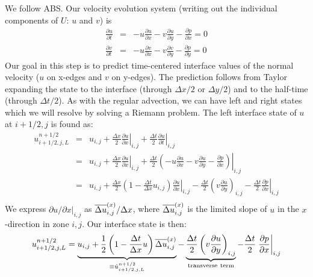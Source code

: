 We follow ABS.  Our velocity evolution system (writing out the
individual components of $U$: $u$ and $v$) is
\begin{eqnarray}
\frac{\partial u}{\partial t} &=& -u \frac{\partial u}{\partial x} 
                                  -v \frac{\partial u}{\partial y} 
                                  -\frac{\partial p}{\partial x} = 0 \\
\frac{\partial v}{\partial t} &=& -u \frac{\partial v}{\partial x} 
                                  -v \frac{\partial v}{\partial y} 
                                  -\frac{\partial p}{\partial y} = 0 
\end{eqnarray}
Our goal in this step is to predict time-centered interface values of
the normal velocity ($u$ on x-edges and $v$ on y-edges).  The
prediction follows from Taylor expanding the state to the interface
(through $\Delta x/2$ or $\Delta y/2$) and to the half-time (through
$\Delta t/2$).  As with the regular advection, we can have left and
right states which we will resolve by solving a Riemann problem.  The
left interface state of $u$ at $i+1/2,j$ is found as:
\begin{eqnarray}
u_{i+1/2,j,L}^{n+1/2} 
  &=& u_{i,j} 
    + \frac{\Delta x}{2} \left . \frac{\partial u}{\partial x} \right |_{i,j}
    + \frac{\Delta t}{2} \left . \frac{\partial u}{\partial t} \right |_{i,j}\\
  &=& u_{i,j} 
    + \frac{\Delta x}{2} \left . \frac{\partial u}{\partial x} \right |_{i,j}
    + \frac{\Delta t}{2} \left . \left (-u \frac{\partial u}{\partial x}
                                -v \frac{\partial u}{\partial y}
                                -\frac{\partial p}{\partial x} \right ) \right |_{i,j}\\
  &=& u_{i,j} 
    + \frac{\Delta x}{2} \left ( 1 - \frac{\Delta t}{\Delta x} u_{i,j} \right )
                         \left .  \frac{\partial u}{\partial x}\right |_{i,j}
    - \frac{\Delta t}{2} \left ( v \frac{\partial u}{\partial y}\right )_{i,j}
    - \frac{\Delta t}{2} \left . \frac{\partial p}{\partial x} \right |_{i,j}\\
\end{eqnarray}
We express ${\partial u}/{\partial x} |_{i,j}$ as $\overline{\Delta u}^{(x)}_{i,j} / \Delta
x$, where $\overline{\Delta u}^{(x)}_{i,j}$ is the limited slope of $u$ in the
$x$-direction in zone $i,j$.  Our interface state is then:
\begin{equation}
u_{i+1/2,j,L}^{n+1/2} 
    = \underbrace{u_{i,j} + \frac{1}{2} \left ( 1 - \frac{\Delta t}{\Delta x} u \right ) \overline{\Delta u}^{(x)}_{i,j}}_{\equiv \hat{u}_{i+1/2,j,L}^{n+1/2}}
    - \underbrace{\frac{\Delta t}{2} \left ( v \frac{\partial u}{\partial y} \right )_{i,j}}_{\mathrm{transverse~term}}
    - \frac{\Delta t}{2} \left . \frac{\partial p}{\partial x} \right |_{i,j}
\label{eq:uMAC_l}
\end{equation} 


